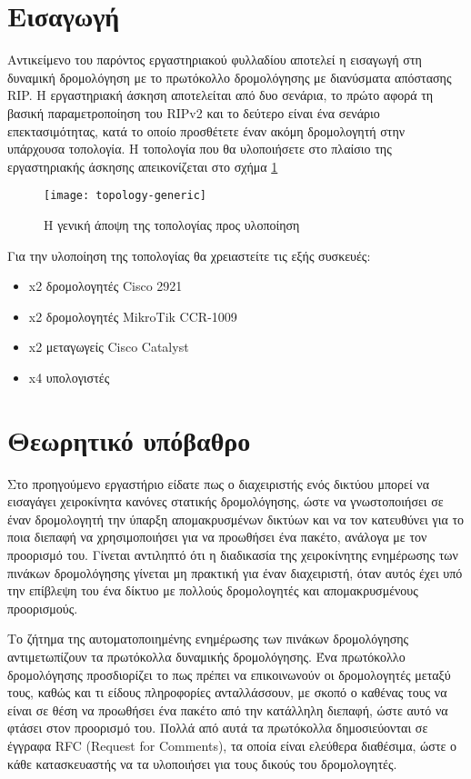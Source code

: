 \documentclass{EdipyLabs} %
\begin{document}
\Initialize

\section*{Εισαγωγή}
Αντικείμενο του παρόντος εργαστηριακού φυλλαδίου αποτελεί η εισαγωγή στη δυναμική δρομολόγηση με το πρωτόκολλο δρομολόγησης με διανύσματα απόστασης RIP. Η εργαστηριακή άσκηση αποτελείται από δυο σενάρια, το πρώτο αφορά τη βασική παραμετροποίηση του RIPv2 και το δεύτερο είναι ένα σενάριο επεκτασιμότητας, κατά το οποίο προσθέτετε έναν ακόμη δρομολογητή στην υπάρχουσα τοπολογία. Η τοπολογία που θα υλοποιήσετε στο πλαίσιο της εργαστηριακής άσκησης απεικονίζεται στο σχήμα \ref{fig:topology-generic}
\begin{figure}[ht]
	\centering
	\texttt{[image: topology-generic]}
	\caption{H γενική άποψη της τοπολογίας προς υλοποίηση}\label{fig:topology-generic}
\end{figure}

Για την υλοποίηση της τοπολογίας θα χρειαστείτε τις εξής συσκευές:
\begin{itemize}
	\item x2 δρομολογητές Cisco 2921
	\item x2 δρομολογητές MikroTik CCR-1009
	\item x2 μεταγωγείς Cisco Catalyst
	\item x4 υπολογιστές
\end{itemize}

\section{Θεωρητικό υπόβαθρο}
Στο προηγούμενο εργαστήριο είδατε πως ο διαχειριστής ενός δικτύου μπορεί να εισαγάγει χειροκίνητα κανόνες στατικής δρομολόγησης, ώστε να γνωστοποιήσει σε έναν δρομολογητή την ύπαρξη απομακρυσμένων δικτύων και να τον κατευθύνει για το ποια διεπαφή να χρησιμοποιήσει για να προωθήσει ένα πακέτο, ανάλογα με τον προορισμό του. Γίνεται αντιληπτό ότι η διαδικασία της χειροκίνητης ενημέρωσης των πινάκων δρομολόγησης γίνεται μη πρακτική για έναν διαχειριστή, όταν αυτός έχει υπό την επίβλεψη του ένα δίκτυο με πολλούς δρομολογητές και απομακρυσμένους προορισμούς.

Το ζήτημα της αυτοματοποιημένης ενημέρωσης των πινάκων δρομολόγησης αντιμετωπίζουν τα πρωτόκολλα δυναμικής δρομολόγησης. Ένα πρωτόκολλο δρομολόγησης προσδιορίζει το πως πρέπει να επικοινωνούν οι δρομολογητές μεταξύ τους, καθώς και τι είδους πληροφορίες ανταλλάσσουν, με σκοπό ο καθένας τους να είναι σε θέση να προωθήσει ένα πακέτο από την κατάλληλη διεπαφή, ώστε αυτό να φτάσει στον προορισμό του. Πολλά από αυτά τα πρωτόκολλα δημοσιεύονται σε έγγραφα RFC (Request for Comments), τα οποία είναι ελεύθερα διαθέσιμα, ώστε ο κάθε κατασκευαστής να τα υλοποιήσει για τους δικούς του δρομολογητές.
\end{document}
